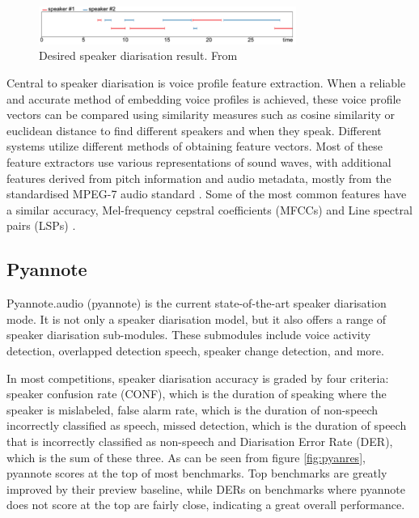 \documentclass[twoside]{uva-inf-bachelor-thesis}
\begin{document}
\begin{figure}[h]
    \centering
    \includegraphics[width=0.75\textwidth]{images/speakerdiaroutput2.png}
    \caption{Desired speaker diarisation result. From \cite{bredin2023pyannote}}
    \label{fig:sdo}
\end{figure}

Central to speaker diarisation is voice profile feature extraction. When a reliable and accurate method of embedding voice profiles is achieved, these voice profile vectors can be compared using similarity measures such as cosine similarity or euclidean distance to find different speakers and when they speak. Different systems utilize different methods of obtaining feature vectors. Most of these feature extractors use various representations of sound waves, with additional features derived from pitch information and audio metadata, mostly from the standardised MPEG-7 audio standard \cite{kotti2008speaker, lu2002speaker}. Some of the most common features have a similar accuracy, Mel-frequency cepstral coefficients
(MFCCs) \cite{gook04} and Line spectral pairs (LSPs) \cite{lu2002speaker}. 

\subsection{Pyannote}\label{sec:pyannote}
 Pyannote.audio (pyannote) is the current state-of-the-art speaker diarisation mode. It is not only a speaker diarisation model, but it also offers a range of speaker diarisation sub-modules. These submodules include voice activity detection, overlapped detection speech, speaker change detection, and more. \cite{bredin2020pyannote, bredin2023pyannote}

In most competitions, speaker diarisation accuracy is graded by four criteria: speaker confusion rate (CONF), which is the duration of speaking where the speaker is mislabeled, false alarm rate, which is the duration of non-speech incorrectly classified as speech, missed detection, which is the duration of speech that is incorrectly classified as non-speech and Diarisation Error Rate (DER), which is the sum of these three. As can be seen from figure \ref{fig:pyanres}, pyannote scores at the top of most benchmarks. Top benchmarks are greatly improved by their preview baseline, while DERs on benchmarks where pyannote does not score at the top are fairly close, indicating a great overall performance. \cite{bredin2023pyannote}
\end{document}
